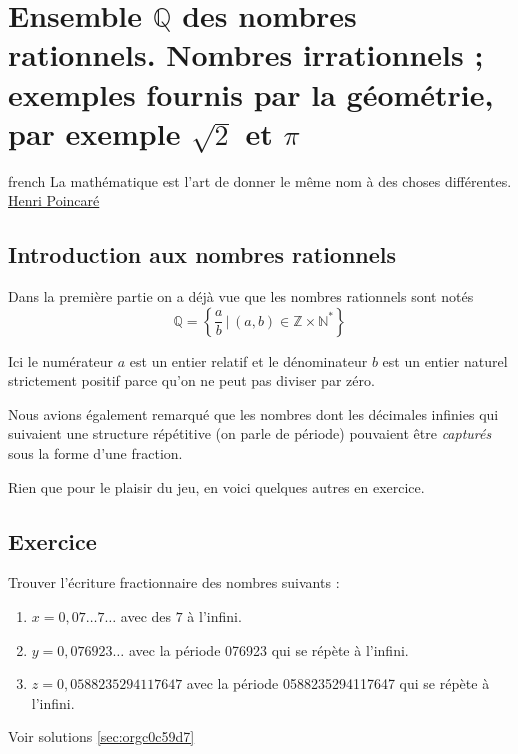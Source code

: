 \documentclass[a4paper, 11pt, twoside]{book}
\newcommand{\N}{\mathbb{N}}
\newcommand{\Z}{\mathbb{Z}}
\newcommand{\Q}{\mathbb{Q}}
\begin{document}
\chapter{Ensemble \(\Q\) des nombres rationnels. Nombres irrationnels ; exemples fournis par la géométrie, par exemple \(\sqrt{2}\) et \(\pi\)}
\label{sec:org4f8ae95}
\startcontents[level-2]

\begin{foreigndisplayquote}{french}
La mathématique est l'art de donner le même nom à des choses différentes.\\

\href{https://fr.wikipedia.org/wiki/Henri\_Poincar\%C3\%A9}{Henri Poincaré}
\end{foreigndisplayquote}
\section{Introduction aux nombres rationnels}
\label{sec:org8e158a5}

Dans la première partie on a déjà vue que les nombres rationnels
sont notés \[\Q = \left\{\dfrac{a}{b}\,|\,(a,
   b)\in\Z\times\N^*\right\}\]

Ici le numérateur \(a\) est un entier relatif et le dénominateur \(b\)
est un entier naturel strictement positif parce qu'on ne peut pas
diviser par zéro.

Nous avions également remarqué que les nombres dont les décimales
infinies qui suivaient une structure répétitive (on parle de
période) pouvaient être \emph{capturés} sous la forme d'une fraction.

Rien que pour le plaisir du jeu, en voici quelques autres en
exercice.

\section{Exercice}
\label{sec:org4c82b4d}
Trouver l'écriture fractionnaire des nombres suivants :
\begin{enumerate}
\item \(x = 0,07\dots7\dots\) avec des \(7\) à l'infini.
\item \(y = 0,076923\dots\) avec la période 076923 qui se répète à
l'infini.
\item \(z = 0,0588235294117647\) avec la période 0588235294117647 qui
se répète à l'infini.
\end{enumerate}


Voir solutions \ref{sec:orgc0c59d7}
\end{document}
